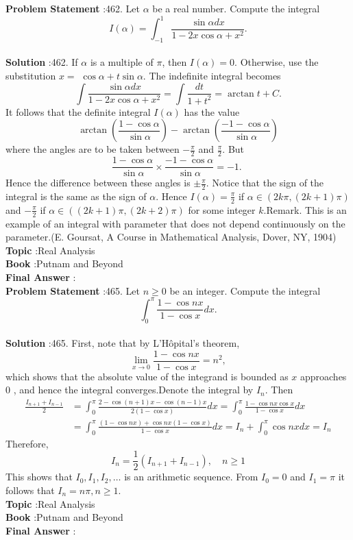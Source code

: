 \documentclass[10pt]{article}
\begin{document}
\textbf{Problem Statement} :462. Let $\alpha$ be a real number. Compute the integral$$ I(\alpha)=\int_{-1}^{1} \frac{\sin \alpha d x}{1-2 x \cos \alpha+x^{2}} . $$\\
\textbf{Solution} :462. If $\alpha$ is a multiple of $\pi$, then $I(\alpha)=0$. Otherwise, use the substitution $x=$ $\cos \alpha+t \sin \alpha$. The indefinite integral becomes$$ \int \frac{\sin \alpha d x}{1-2 x \cos \alpha+x^{2}}=\int \frac{d t}{1+t^{2}}=\arctan t+C . $$It follows that the definite integral $I(\alpha)$ has the value $$ \arctan \left(\frac{1-\cos \alpha}{\sin \alpha}\right)-\arctan \left(\frac{-1-\cos \alpha}{\sin \alpha}\right) $$where the angles are to be taken between $-\frac{\pi}{2}$ and $\frac{\pi}{2}$. But$$ \frac{1-\cos \alpha}{\sin \alpha} \times \frac{-1-\cos \alpha}{\sin \alpha}=-1 \text {. } $$Hence the difference between these angles is $\pm \frac{\pi}{2}$. Notice that the sign of the integral is the same as the sign of $\alpha$. Hence $I(\alpha)=\frac{\pi}{2}$ if $\alpha \in(2 k \pi,(2 k+1) \pi)$ and $-\frac{\pi}{2}$ if $\alpha \in((2 k+1) \pi,(2 k+2) \pi)$ for some integer $k$.Remark. This is an example of an integral with parameter that does not depend continuously on the parameter.(E. Goursat, A Course in Mathematical Analysis, Dover, NY, 1904)\\
\textbf{Topic} :Real Analysis\\
\textbf{Book} :Putnam and Beyond\\
\textbf{Final Answer} :\\


\textbf{Problem Statement} :465. Let $n \geq 0$ be an integer. Compute the integral$$ \int_{0}^{\pi} \frac{1-\cos n x}{1-\cos x} d x . $$\\
\textbf{Solution} :465. First, note that by L'Hôpital's theorem,$$ \lim _{x \rightarrow 0} \frac{1-\cos n x}{1-\cos x}=n^{2}, $$which shows that the absolute value of the integrand is bounded as $x$ approaches 0 , and hence the integral converges.Denote the integral by $I_{n}$. Then$$ \begin{aligned} \frac{I_{n+1}+I_{n-1}}{2} &=\int_{0}^{\pi} \frac{2-\cos (n+1) x-\cos (n-1) x}{2(1-\cos x)} d x=\int_{0}^{\pi} \frac{1-\cos n x \cos x}{1-\cos x} d x \\ &=\int_{0}^{\pi} \frac{(1-\cos n x)+\cos n x(1-\cos x)}{1-\cos x} d x=I_{n}+\int_{0}^{\pi} \cos n x d x=I_{n} \end{aligned} $$Therefore,$$ I_{n}=\frac{1}{2}\left(I_{n+1}+I_{n-1}\right), \quad n \geq 1 $$This shows that $I_{0}, I_{1}, I_{2}, \ldots$ is an arithmetic sequence. From $I_{0}=0$ and $I_{1}=\pi$ it follows that $I_{n}=n \pi, n \geq 1$.\\
\textbf{Topic} :Real Analysis\\
\textbf{Book} :Putnam and Beyond\\
\textbf{Final Answer} :\\
\end{document}
